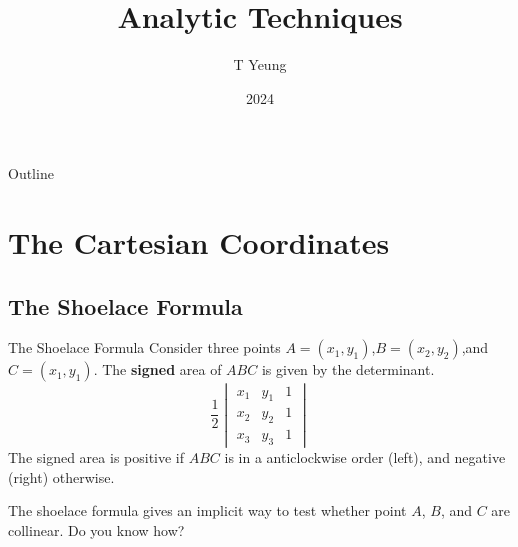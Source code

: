 \documentclass{beamer}
\title{Analytic Techniques}
\author{T Yeung}
\institute{THMSS}
\date{2024}
\begin{document}
\setlength{\abovedisplayskip}{3pt}
\setlength{\belowdisplayskip}{3pt}

\frame{\titlepage}
\begin{frame}{Outline}
	\tableofcontents[pausesections]
\end{frame}

\section{The Cartesian Coordinates}

\subsection{The Shoelace Formula}
\begin{frame}{The Shoelace Formula}
	Consider three points $A = (x_1,y_1)$,$B=(x_2,y_2)$,and $C=(x_1,y_1)$. The \textbf{signed} area of $ABC$ is given by the determinant.
	\[
		\frac{1}{2}
		\begin{vmatrix}
			x_1 & y_1 & 1 \\
			x_2 & y_2 & 1 \\
			x_3 & y_3 & 1
		\end{vmatrix}
	\]
	The signed area is positive if $ABC$ is in a anticlockwise order (left), and negative (right) otherwise.
	\begin{figure}[H]
		\hspace{2cm}
	\end{figure}
	\begin{block}{}
		The shoelace formula gives an implicit way to test whether point $A$, $B$, and $C$ are collinear. Do you know how?	
	\end{block}
\end{frame}
\end{document}
